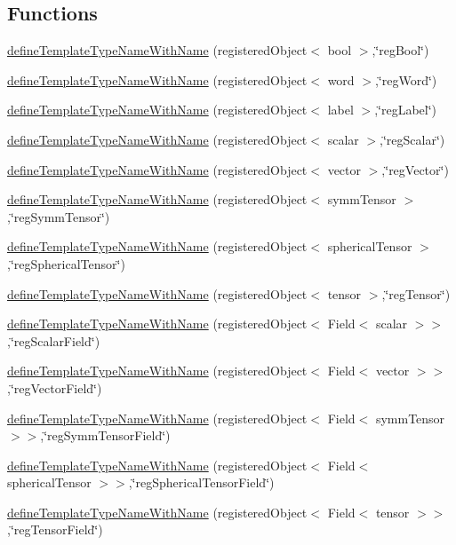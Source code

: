 \subsection*{Functions}
\begin{DoxyCompactItemize}
\item 
\hyperlink{namespaceFoam_ab79d10bbf7924f944e22abcf9c1c1345}{define\+Template\+Type\+Name\+With\+Name} (registered\+Object$<$ bool $>$,\char`\"{}reg\+Bool\char`\"{})
\item 
\hyperlink{namespaceFoam_ae1332b21fc83374fca065787dc7ca72c}{define\+Template\+Type\+Name\+With\+Name} (registered\+Object$<$ word $>$,\char`\"{}reg\+Word\char`\"{})
\item 
\hyperlink{namespaceFoam_ae1105e5c7c72c6a06cfd5725ad18e789}{define\+Template\+Type\+Name\+With\+Name} (registered\+Object$<$ label $>$,\char`\"{}reg\+Label\char`\"{})
\item 
\hyperlink{namespaceFoam_a8a0acabced698824d8b0c35114c7b17a}{define\+Template\+Type\+Name\+With\+Name} (registered\+Object$<$ scalar $>$,\char`\"{}reg\+Scalar\char`\"{})
\item 
\hyperlink{namespaceFoam_af436d575d2f607de7b422ed3af6fcce9}{define\+Template\+Type\+Name\+With\+Name} (registered\+Object$<$ vector $>$,\char`\"{}reg\+Vector\char`\"{})
\item 
\hyperlink{namespaceFoam_a3a08b222616bcea3e311f1e914545cd0}{define\+Template\+Type\+Name\+With\+Name} (registered\+Object$<$ symm\+Tensor $>$,\char`\"{}reg\+Symm\+Tensor\char`\"{})
\item 
\hyperlink{namespaceFoam_ab006775e61e5862607151736454c42de}{define\+Template\+Type\+Name\+With\+Name} (registered\+Object$<$ spherical\+Tensor $>$,\char`\"{}reg\+Spherical\+Tensor\char`\"{})
\item 
\hyperlink{namespaceFoam_a0a66c7d2a1d438b5e1688a110f674aaa}{define\+Template\+Type\+Name\+With\+Name} (registered\+Object$<$ tensor $>$,\char`\"{}reg\+Tensor\char`\"{})
\item 
\hyperlink{namespaceFoam_a7b6d39b089f807824b138214100530eb}{define\+Template\+Type\+Name\+With\+Name} (registered\+Object$<$ Field$<$ scalar $>$$>$,\char`\"{}reg\+Scalar\+Field\char`\"{})
\item 
\hyperlink{namespaceFoam_a842e7850f6a014ed9c2edc14bbee76b2}{define\+Template\+Type\+Name\+With\+Name} (registered\+Object$<$ Field$<$ vector $>$$>$,\char`\"{}reg\+Vector\+Field\char`\"{})
\item 
\hyperlink{namespaceFoam_a0c01340c2979b0b205956cad82214dfe}{define\+Template\+Type\+Name\+With\+Name} (registered\+Object$<$ Field$<$ symm\+Tensor $>$$>$,\char`\"{}reg\+Symm\+Tensor\+Field\char`\"{})
\item 
\hyperlink{namespaceFoam_ae4b7757ec6f514f49f9ef46164301743}{define\+Template\+Type\+Name\+With\+Name} (registered\+Object$<$ Field$<$ spherical\+Tensor $>$$>$,\char`\"{}reg\+Spherical\+Tensor\+Field\char`\"{})
\item 
\hyperlink{namespaceFoam_ade1772d0a4f79344abb501cfdd659cfa}{define\+Template\+Type\+Name\+With\+Name} (registered\+Object$<$ Field$<$ tensor $>$$>$,\char`\"{}reg\+Tensor\+Field\char`\"{})
\end{DoxyCompactItemize}


